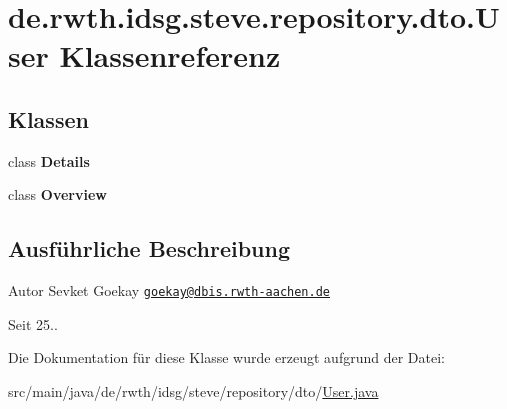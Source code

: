 \hypertarget{classde_1_1rwth_1_1idsg_1_1steve_1_1repository_1_1dto_1_1_user}{\section{de.\-rwth.\-idsg.\-steve.\-repository.\-dto.\-User Klassenreferenz}
\label{classde_1_1rwth_1_1idsg_1_1steve_1_1repository_1_1dto_1_1_user}
}
\subsection*{Klassen}
\begin{DoxyCompactItemize}
\item 
class {\bfseries Details}
\item 
class {\bfseries Overview}
\end{DoxyCompactItemize}


\subsection{Ausführliche Beschreibung}
\begin{DoxyAuthor}{Autor}
Sevket Goekay \href{mailto:goekay@dbis.rwth-aachen.de}{\tt goekay@dbis.\-rwth-\/aachen.\-de} 
\end{DoxyAuthor}
\begin{DoxySince}{Seit}
25.. 
\end{DoxySince}


Die Dokumentation für diese Klasse wurde erzeugt aufgrund der Datei\-:\begin{DoxyCompactItemize}
\item 
src/main/java/de/rwth/idsg/steve/repository/dto/\hyperlink{_user_8java}{User.\-java}\end{DoxyCompactItemize}

